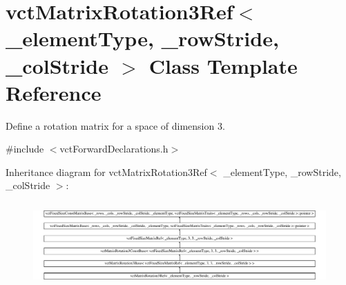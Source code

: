 \hypertarget{classvct_matrix_rotation3_ref}{}\section{vct\+Matrix\+Rotation3\+Ref$<$ \+\_\+element\+Type, \+\_\+row\+Stride, \+\_\+col\+Stride $>$ Class Template Reference}
\label{classvct_matrix_rotation3_ref}


Define a rotation matrix for a space of dimension 3.  




{\ttfamily \#include $<$vct\+Forward\+Declarations.\+h$>$}

Inheritance diagram for vct\+Matrix\+Rotation3\+Ref$<$ \+\_\+element\+Type, \+\_\+row\+Stride, \+\_\+col\+Stride $>$\+:\begin{figure}[H]
\begin{center}
\leavevmode
\includegraphics[height=3.297350cm]{db/d0b/classvct_matrix_rotation3_ref}
\end{center}
\end{figure}
